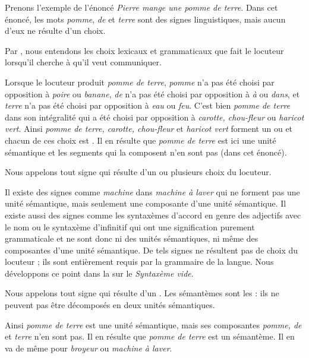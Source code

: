 Prenons l’exemple de l’énoncé \textit{Pierre mange une pomme de terre}. Dans cet énoncé, les mots \textit{pomme}, \textit{de} et \textit{terre} sont des signes linguistiques, mais aucun d’eux ne résulte d’un choix.

{Par , nous entendons les choix lexicaux et grammaticaux que fait le locuteur lorsqu’il cherche à  qu’il veut communiquer.}

Lorsque le locuteur produit \textit{pomme de terre}, \textit{pomme} n’a pas été choisi par opposition à \textit{poire} ou \textit{banane}, \textit{de} n’a pas été choisi par opposition à \textit{à} ou \textit{dans}, et \textit{terre} n’a pas été choisi par opposition à \textit{eau} ou \textit{feu}. C’est bien \textit{pomme de terre} dans son intégralité qui a été choisi par opposition à \textit{carotte, chou-fleur} ou \textit{haricot vert}. Ainsi \textit{pomme de terre, carotte, chou-fleur} et \textit{haricot vert} forment un  ou  et chacun de ces choix est . Il en résulte que \textit{pomme de terre} est ici une unité sémantique et les segments qui la composent n’en sont pas (dans cet énoncé).

{Nous appelons  tout signe qui résulte d’un ou plusieurs choix du locuteur.}

Il existe des signes comme \textit{machine} dans \textit{machine à laver} qui ne forment pas une unité sémantique, mais seulement une composante d’une unité sémantique. Il existe aussi des signes comme les syntaxèmes d’accord en genre des adjectifs avec le nom ou le syntaxème d’infinitif qui ont une signification purement grammaticale et ne sont donc ni des unités sémantiques, ni même des composantes d’une unité sémantique. De tels signes ne résultent pas de choix du locuteur ; ils sont entièrement requis par la grammaire de la langue. Nous développons ce point dans la  sur le \textit{Syntaxème vide}.

{Nous appelons  tout signe qui résulte d’un . Les sémantèmes sont les  : ils ne peuvent pas être décomposés en deux unités sémantiques.}

Ainsi \textit{pomme de terre} est une unité sémantique, mais ses composantes \textit{pomme, de} et \textit{terre} n’en sont pas. Il en résulte que \textit{pomme de terre} est un sémantème. Il en va de même pour \textit{broyeur} ou \textit{machine à laver}.

